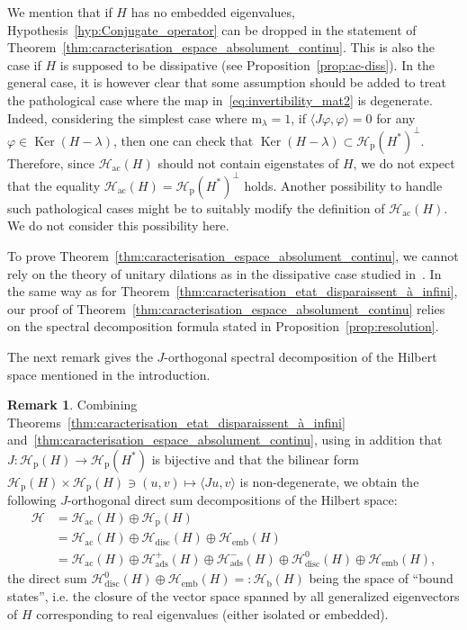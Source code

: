 \documentclass[10pt]{amsart}
\theoremstyle{definition}\newtheorem{defi}[theo]{Definition}\newtheorem{rema}[theo]{Remark}\newtheorem{exam}[theo]{Example}\newtheorem{exem}[theo]{Example}\newtheorem{nota}[theo]{Notation}
\newcommand{\Hi}{\mathcal{H}}
\newcommand{\rmp}{\mathrm{p}}
\newcommand{\acr}{\mathrm{ac}}
\newcommand{\ads}{\mathrm{ads}}
\newcommand{\rmb}{\mathrm{b}}
\newcommand{\rmm}{\mathrm{m}}
\newcommand{\disc}{\mathrm{disc}}
\DeclareMathOperator{\Ker}{Ker}
\begin{document}
We mention that if $H$ has no embedded eigenvalues, Hypothesis~\ref{hyp:Conjugate_operator} can be dropped in the statement of Theorem~\ref{thm:caracterisation_espace_absolument_continu}. This is also the case if $H$ is supposed to be dissipative (see Proposition~\ref{prop:ac-diss}). In the general case, it is however clear that some assumption should be added to treat the pathological case where the map in~\eqref{eq:invertibility_mat2} is degenerate. Indeed, considering the simplest case where $\rmm_\lambda=1$, if $\langle J\varphi,\varphi\rangle=0$ for any $\varphi\in\Ker(H-\lambda)$, then one can check that $\Ker(H-\lambda)\subset\Hi_{\rmp}(H^*)^\perp$. Therefore, since $\Hi_\acr(H)$ should not contain eigenstates of $H$, we do not expect that the equality $\Hi_\acr(H)=\Hi_\rmp(H^*)^\perp$ holds. Another possibility to handle such pathological cases might be to suitably modify the definition of $\Hi_\acr(H)$. We do not consider this possibility here.

To prove Theorem~\ref{thm:caracterisation_espace_absolument_continu}, we cannot rely on the theory of unitary dilations as in the dissipative case studied in~\cite{Da80_01}. In the same way as for Theorem~\ref{thm:caracterisation_etat_disparaissent_à_infini}, our proof of Theorem~\ref{thm:caracterisation_espace_absolument_continu} relies on the spectral decomposition formula stated in Proposition~\ref{prop:resolution}.


The next remark gives the $J$-orthogonal spectral decomposition of the Hilbert space mentioned in the introduction.

\begin{rema}
Combining Theorems~\ref{thm:caracterisation_etat_disparaissent_à_infini} and~\ref{thm:caracterisation_espace_absolument_continu}, using in addition that $J:\Hi_{\rmp}(H)\to\Hi_{\rmp}(H^*)$ is bijective and that the bilinear form $\mathcal{H}_{\mathrm{p}}(H)\times\mathcal{H}_{\mathrm{p}}(H) \ni (u,v)\mapsto \langle Ju,v\rangle$ is non-degenerate, we obtain the following $J$-orthogonal direct sum decompositions of the Hilbert space:
\begin{align*}
\Hi &= \Hi_{\acr}(H) \oplus \Hi_{\rmp}(H) \\
&= \Hi_{\acr}(H) \oplus \Hi_{\disc}(H)\oplus\Hi_{\mathrm{emb}}(H) \\
&= \Hi_{\acr}(H) \oplus \Hi_{\ads}^+(H)\oplus\Hi_{\ads}^-(H)\oplus\Hi_{\disc}^0(H)\oplus\Hi_{\mathrm{emb}}(H),
\end{align*}
the direct sum $\Hi_{\disc}^0(H)\oplus\Hi_{\mathrm{emb}}(H)=:\Hi_{\rmb}(H)$ being the space of ``bound states'', i.e. the closure of the vector space spanned by all generalized eigenvectors of $H$ corresponding to real eigenvalues (either isolated or embedded).
\end{rema}
\end{document}
